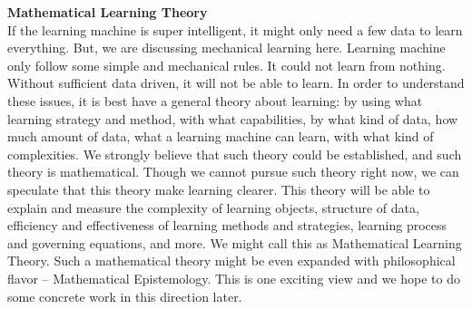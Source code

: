 {\bf Mathematical Learning Theory} \\
If the learning machine is super intelligent, it might only need a few data to learn everything. But, we are discussing mechanical learning here. Learning machine only follow some simple and mechanical rules. It could not learn from nothing. Without sufficient data driven, it will not be able to learn. In order to understand these issues, it is best have a general theory about learning: by using what learning strategy and method, with what capabilities, by what kind of data, how much amount of data, what a learning machine can learn, with what kind of complexities. We strongly believe that such theory could be established, and such theory is mathematical. Though we cannot pursue such theory right now, we can speculate that this theory make learning clearer. This theory will be able to explain and measure the complexity of learning objects, structure of data, efficiency and effectiveness of learning methods and strategies, learning process and governing equations, and more. We might call this as Mathematical Learning Theory. Such a mathematical theory might be even expanded with philosophical flavor -- Mathematical Epistemology. This is one exciting view and we hope to do some concrete work in this direction later.
\bigskip

